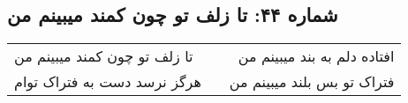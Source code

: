 \begin{center}
\section*{شماره ۴۴: تا زلف تو چون کمند میبینم من}
\label{sec:044}
\begin{longtable}{l p{0.5cm} r}
تا زلف تو چون کمند میبینم من
&&
افتاده دلم به بند میبینم من
\\
هرگز نرسد دست به فتراک توام
&&
فتراک تو بس بلند میبینم من
\\
\end{longtable}
\end{center}
